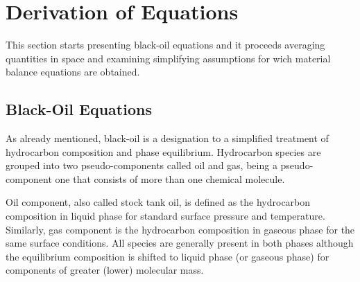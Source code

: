 \documentclass[authoryear,preprint,review,12pt]{elsarticle}
\begin{document}
%
%
%
%
%

\section{Derivation of Equations}

This section starts presenting black-oil equations and it proceeds averaging quantities in space and examining simplifying assumptions for wich material balance equations are obtained.

\subsection{Black-Oil Equations}

As already mentioned, black-oil is a designation to a simplified treatment of hydrocarbon composition and phase equilibrium. Hydrocarbon species are grouped into two pseudo-components called oil and gas, being a pseudo-component one that consists of more than one chemical molecule.

Oil component, also called stock tank oil, is defined as the hydrocarbon composition in liquid phase for standard surface pressure and temperature. Similarly, gas component is the hydrocarbon composition in gaseous phase for the same surface conditions. All species are generally present in both phases although the equilibrium composition is shifted to liquid phase (or gaseous phase) for components of greater (lower) molecular mass.
\end{document}
